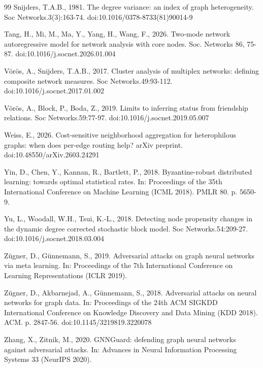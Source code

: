 \documentclass[onecolumn,pdflatex,sn-basic,Numbered]{sn-jnl}
\theoremstyle{thmstyleone}
\theoremstyle{thmstylethree}
\begin{document}
\begin{thebibliography}{99}
Snijders, T.A.B., 1981. The degree variance: an index of graph heterogeneity. Soc Networks.3(3):163-74. doi:10.1016/0378-8733(81)90014-9

Tang, H., Mi, M., Ma, Y., Yang, H., Wang, F., 2026. Two-mode network autoregressive model for network analysis with core nodes. Soc. Networks 86, 75-87. doi:10.1016/j.socnet.2026.01.004

V\"or\"os, A., Snijders, T.A.B., 2017. Cluster analysis of multiplex networks: defining composite network measures. Soc Networks.49:93-112. doi:10.1016/j.socnet.2017.01.002

V\"or\"os, A., Block, P., Boda, Z., 2019. Limits to inferring status from friendship relations. Soc Networks.59:77-97. doi:10.1016/j.socnet.2019.05.007

Weiss, E., 2026. Cost-sensitive neighborhood aggregation for heterophilous graphs: when does per-edge routing help? arXiv preprint. doi:10.48550/arXiv.2603.24291

Yin, D., Chen, Y., Kannan, R., Bartlett, P., 2018. Byzantine-robust distributed learning: towards optimal statistical rates. In: Proceedings of the 35th International Conference on Machine Learning (ICML 2018). PMLR 80. p. 5650-9.

Yu, L., Woodall, W.H., Tsui, K.-L., 2018. Detecting node propensity changes in the dynamic degree corrected stochastic block model. Soc Networks.54:209-27. doi:10.1016/j.socnet.2018.03.004

Z\"ugner, D., G\"unnemann, S., 2019. Adversarial attacks on graph neural networks via meta learning. In: Proceedings of the 7th International Conference on Learning Representations (ICLR 2019).

Z\"ugner, D., Akbarnejad, A., G\"unnemann, S., 2018. Adversarial attacks on neural networks for graph data. In: Proceedings of the 24th ACM SIGKDD International Conference on Knowledge Discovery and Data Mining (KDD 2018). ACM. p. 2847-56. doi:10.1145/3219819.3220078

Zhang, X., Zitnik, M., 2020. GNNGuard: defending graph neural networks against adversarial attacks. In: Advances in Neural Information Processing Systems 33 (NeurIPS 2020).


\end{thebibliography}
\end{document}
